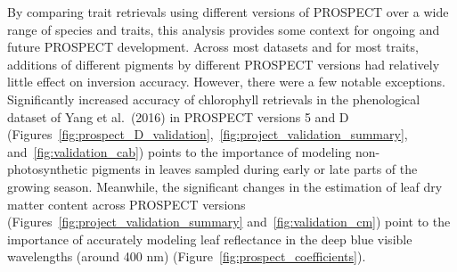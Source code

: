 % 
% 
%
By comparing trait retrievals using different versions of PROSPECT over a wide range of species and traits, this analysis provides some context for ongoing and future PROSPECT development.
% 
% 
Across most datasets and for most traits, additions of different pigments by different PROSPECT versions had relatively little effect on inversion accuracy.
However, there were a few notable exceptions.
Significantly increased accuracy of chlorophyll retrievals in the phenological dataset of Yang et al.~(2016) \nocite{yang_2016_seasonal} in PROSPECT versions 5 and D (Figures~\ref{fig:prospect_D_validation},~\ref{fig:project_validation_summary}, and~\ref{fig:validation_cab}) points to the importance of modeling non-photosynthetic pigments in leaves sampled during early or late parts of the growing season.
Meanwhile, the significant changes in the estimation of leaf dry matter content across PROSPECT versions (Figures~\ref{fig:project_validation_summary} and~\ref{fig:validation_cm}) point to the importance of accurately modeling leaf reflectance in the deep blue visible wavelengths (around 400 nm) (Figure~\ref{fig:prospect_coefficients}).

